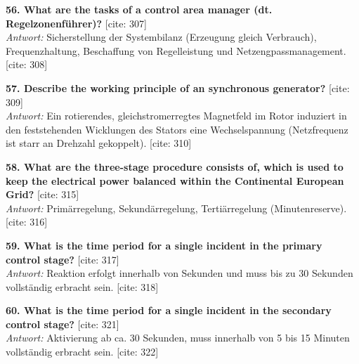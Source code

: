 \documentclass[11pt,a4paper]{article}
\begin{document}
\textbf{56. What are the tasks of a control area manager (dt. Regelzonenführer)?} [cite: 307]\\
\textit{Antwort:} Sicherstellung der Systembilanz (Erzeugung gleich Verbrauch), Frequenzhaltung, Beschaffung von Regelleistung und Netzengpassmanagement. [cite: 308]

\vspace{0.5cm}
\textbf{57. Describe the working principle of an synchronous generator?} [cite: 309]\\
\textit{Antwort:} Ein rotierendes, gleichstromerregtes Magnetfeld im Rotor induziert in den feststehenden Wicklungen des Stators eine Wechselspannung (Netzfrequenz ist starr an Drehzahl gekoppelt). [cite: 310]

\vspace{0.5cm}
\textbf{58. What are the three-stage procedure consists of, which is used to keep the electrical power balanced within the Continental European Grid?} [cite: 315]\\
\textit{Antwort:} Primärregelung, Sekundärregelung, Tertiärregelung (Minutenreserve). [cite: 316]

\vspace{0.5cm}
\textbf{59. What is the time period for a single incident in the primary control stage?} [cite: 317]\\
\textit{Antwort:} Reaktion erfolgt innerhalb von Sekunden und muss bis zu 30 Sekunden vollständig erbracht sein. [cite: 318]

\vspace{0.5cm}
\textbf{60. What is the time period for a single incident in the secondary control stage?} [cite: 321]\\
\textit{Antwort:} Aktivierung ab ca. 30 Sekunden, muss innerhalb von 5 bis 15 Minuten vollständig erbracht sein. [cite: 322]
\end{document}
